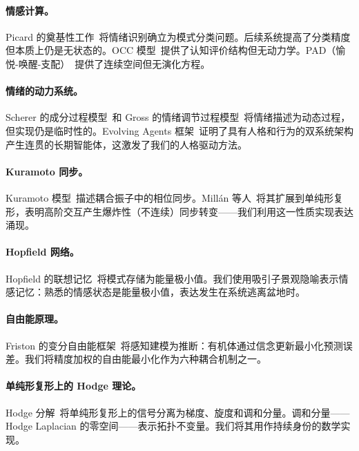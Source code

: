 \documentclass[UTF8,11pt]{ctexart}
\begin{document}
\paragraph{情感计算。}Picard 的奠基性工作~\cite{picard1997}将情绪识别确立为模式分类问题。后续系统提高了分类精度但本质上仍是无状态的。OCC 模型~\cite{occ1988}提供了认知评价结构但无动力学。PAD（愉悦-唤醒-支配）~\cite{mehrabian1996}提供了连续空间但无演化方程。

\paragraph{情绪的动力系统。}Scherer 的成分过程模型~\cite{scherer2001}和 Gross 的情绪调节过程模型~\cite{gross2015}将情绪描述为动态过程，但实现仍是临时性的。Evolving Agents 框架~\cite{evolving2024}证明了具有人格和行为的双系统架构产生连贯的长期智能体，这激发了我们的人格驱动方法。

\paragraph{Kuramoto 同步。}Kuramoto 模型~\cite{kuramoto1975}描述耦合振子中的相位同步。Mill\'an 等人~\cite{millan2020}将其扩展到单纯形复形，表明高阶交互产生爆炸性（不连续）同步转变——我们利用这一性质实现表达涌现。

\paragraph{Hopfield 网络。}Hopfield 的联想记忆~\cite{hopfield1982}将模式存储为能量极小值。我们使用吸引子景观隐喻表示情感记忆：熟悉的情感状态是能量极小值，表达发生在系统逃离盆地时。

\paragraph{自由能原理。}Friston 的变分自由能框架~\cite{friston2010}将感知建模为推断：有机体通过信念更新最小化预测误差。我们将精度加权的自由能最小化作为六种耦合机制之一。

\paragraph{单纯形复形上的 Hodge 理论。}Hodge 分解~\cite{hodge1941}将单纯形复形上的信号分离为梯度、旋度和调和分量。调和分量——Hodge Laplacian 的零空间——表示拓扑不变量。我们将其用作持续身份的数学实现。

\end{document}
